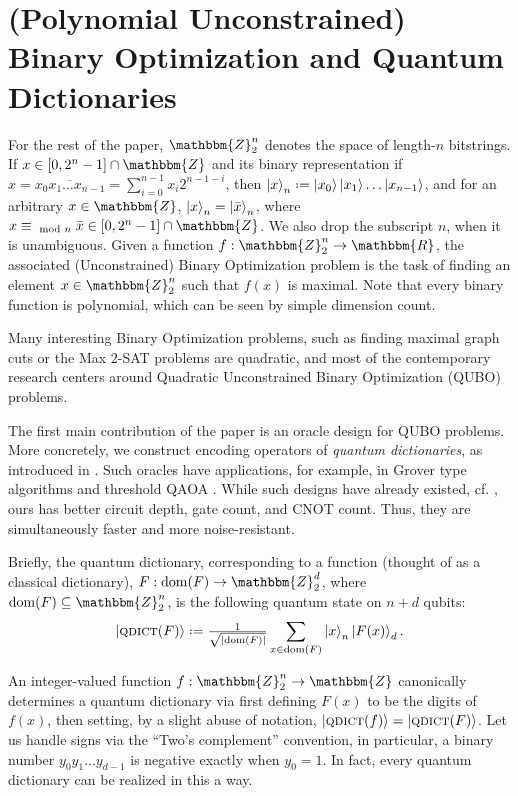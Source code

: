 \documentclass[reqno, 10pt]{amsart}
\numberwithin{equation}{section}                %
\let\originalleft\left
\let\originalright\right
\renewcommand{\left}{\mathopen{}\mathclose\bgroup\originalleft}
\renewcommand{\right}{\aftergroup\egroup\originalright}
\def\({\mathopen{}\left(}
\def\){\right)\mathclose{}}
\newcommand*{\eqdef}{\mathrel{\vcenter{\baselineskip0.5ex \lineskiplimit0pt\hbox{.}\hbox{.}}}=}
\def\rl{\mathbbm{R}}
\def\Z{\mathbbm{Z}}
\def\dom{\mathrm{dom}}
\def\qdict{\textsc{qdict}}
\begin{document}
\bigskip

\section{(Polynomial Unconstrained) Binary Optimization and Quantum Dictionaries}
\label{sec:qubos_and_qdicts}

For the rest of the paper, $\Z_2^n$ denotes the space of length-$n$ bitstrings. If $x \in [0, 2^n - 1] \cap \Z$ and its binary representation if $x = \overline{x_0 x_1 \ldots x_{n - 1}} = \sum_{i = 0}^{n - 1} x_i 2^{n - 1 - i}$, then $\ket{x}_n \eqdef \ket{x_0} \ket{x_1} \ldots \ket{x_{n - 1}}$, and for an arbitrary $x \in \Z$, $\ket{x}_n = \ket{\bar{x}}_n$, where $x \equiv_{\mod n} \bar{x} \in [0, 2^n - 1] \cap \Z$. We also drop the subscript $n$, when it is unambiguous. Given a function $f : \Z_2^n \rightarrow \rl$, the associated (Unconstrained) Binary Optimization problem is the task of finding an element $x \in \Z_2^n$ such that $f (x)$ is maximal. Note that every binary function is polynomial, which can be seen by simple dimension count.

Many interesting Binary Optimization problems, such as finding maximal graph cuts or the Max $2$-SAT problems are quadratic, and most of the contemporary research centers around Quadratic Unconstrained  Binary Optimization (QUBO) problems.

\medskip

The first main contribution of the paper is an oracle design for QUBO problems. More concretely, we construct encoding operators of \emph{quantum dictionaries}, as introduced in \cite{gilliam_foundational_2021}. Such oracles have applications, for example, in Grover type algorithms and threshold QAOA \cite{golden_threshold_2021}. While such designs have already existed, cf. \cite{gilliam_grover_2021}, ours has better circuit depth, gate count, and CNOT count. Thus, they are simultaneously faster and more noise-resistant.

Briefly, the quantum dictionary, corresponding to a function (thought of as a classical dictionary), $F: \dom \( F \) \rightarrow \Z_2^d$, where $\dom \( F \) \subseteq \Z_2^n$, is the following quantum state on $n + d$ qubits:
\begin{equation}
   \ket{\qdict \( F \)} \eqdef \tfrac{1}{\sqrt{\left| \dom \( F \) \right|}} \sum\limits_{x \in \dom \( F \)} \ket{x}_n \ket{F (x)}_d.
\end{equation}

An integer-valued function $f : \Z_2^n \rightarrow \Z$ canonically determines a quantum dictionary via first defining $F (x)$ to be the digits of $f (x)$, then setting, by a slight abuse of notation, $\ket{\qdict \( f \)} = \ket{\qdict \( F \)}$. Let us handle signs via the ``Two's complement'' convention, in particular, a binary number $y_0 y_1 \ldots y_{d - 1}$ is negative exactly when $y_0 = 1$. In fact, every quantum dictionary can be realized in this a way.
\end{document}
